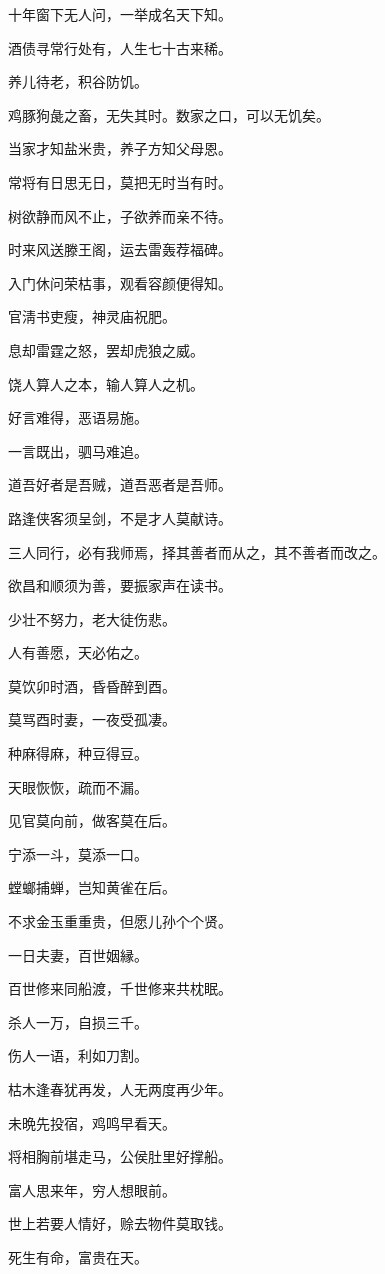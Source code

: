 \documentclass[12pt,oneside]{book}
\begin{document}
十年窗下无人问，一举成名天下知。

酒债寻常行处有，人生七十古来稀。

养儿待老，积谷防饥。

鸡豚狗彘之畜，无失其时。数家之口，可以无饥矣。

当家才知盐米贵，养子方知父母恩。

常将有日思无日，莫把无时当有时。

树欲静而风不止，子欲养而亲不待。

时来风送滕王阁，运去雷轰荐福碑。

入门休问荣枯事，观看容颜便得知。

官淸书吏瘦，神灵庙祝肥。

息却雷霆之怒，罢却虎狼之威。

饶人算人之本，输人算人之机。

好言难得，恶语易施。

一言既出，驷马难追。

道吾好者是吾贼，道吾恶者是吾师。

路逢侠客须呈剑，不是才人莫献诗。

三人同行，必有我师焉，择其善者而从之，其不善者而改之。

欲昌和顺须为善，要振家声在读书。

少壮不努力，老大徒伤悲。

人有善愿，天必佑之。

莫饮卯时酒，昏昏醉到酉。

莫骂酉时妻，一夜受孤凄。

种麻得麻，种豆得豆。

天眼恢恢，疏而不漏。

见官莫向前，做客莫在后。

宁添一斗，莫添一口。

螳螂捕蝉，岂知黄雀在后。

不求金玉重重贵，但愿儿孙个个贤。

一日夫妻，百世姻縁。

百世修来同船渡，千世修来共枕眠。

杀人一万，自损三千。

伤人一语，利如刀割。

枯木逢春犹再发，人无两度再少年。

未晩先投宿，鸡鸣早看天。

将相胸前堪走马，公侯肚里好撑船。

富人思来年，穷人想眼前。

世上若要人情好，赊去物件莫取钱。

死生有命，富贵在天。
\end{document}
